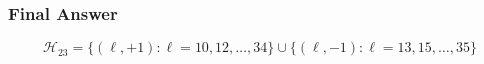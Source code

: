 \subsubsection*{Final Answer}

\[
\boxed{
\mathcal H_{23}
=\{(\ell,+1):\ell=10,12,\ldots,34\}
\cup
\{(\ell,-1):\ell=13,15,\ldots,35\}
}
\]
